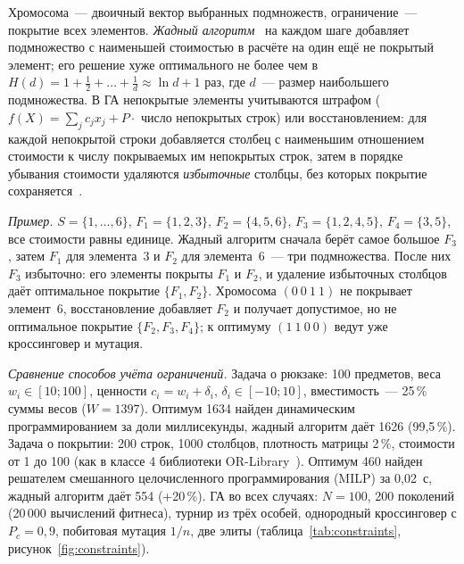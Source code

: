 Хромосома~--- двоичный вектор выбранных подмножеств, ограничение~--- покрытие всех элементов.
\emph{Жадный алгоритм}~\cite{chvatal1979} на каждом шаге добавляет подмножество с наименьшей стоимостью
в расчёте на один ещё не покрытый элемент; его решение хуже оптимального не более чем в
$H(d) = 1 + \frac12 + \ldots + \frac1d \approx \ln d + 1$ раз, где $d$~--- размер наибольшего подмножества.
В ГА непокрытые элементы учитываются штрафом ($f(X) = \sum_j c_j x_j + P \cdot$ число непокрытых
строк) или восстановлением: для каждой непокрытой строки добавляется столбец с наименьшим отношением
стоимости к числу покрываемых им непокрытых строк, затем в порядке убывания стоимости удаляются
\emph{избыточные} столбцы, без которых покрытие сохраняется~\cite{beasley1996}.

\emph{Пример.} $S = \{1, \ldots, 6\}$, $F_1 = \{1, 2, 3\}$, $F_2 = \{4, 5, 6\}$, $F_3 = \{1, 2, 4, 5\}$,
$F_4 = \{3, 5\}$, все стоимости равны единице. Жадный алгоритм сначала берёт самое большое $F_3$, затем
$F_1$ для элемента~3 и $F_2$ для элемента~6~--- три подмножества. После них $F_3$ избыточно: его
элементы покрыты $F_1$ и $F_2$, и удаление избыточных столбцов даёт оптимальное покрытие $\{F_1, F_2\}$.
Хромосома $(0\ 0\ 1\ 1)$ не покрывает элемент~6, восстановление добавляет $F_2$ и получает допустимое,
но не оптимальное покрытие $\{F_2, F_3, F_4\}$; к оптимуму $(1\ 1\ 0\ 0)$ ведут уже кроссинговер и
мутация.

\emph{Сравнение способов учёта ограничений.} Задача о рюкзаке: 100 предметов, веса $w_i \in [10; 100]$,
ценности $c_i = w_i + \delta_i$, $\delta_i \in [-10; 10]$, вместимость~--- 25\,\% суммы весов
($W = 1397$). Оптимум 1634 найден динамическим программированием за доли миллисекунды, жадный алгоритм
даёт 1626 (99,5\,\%). Задача о покрытии: 200 строк, 1000 столбцов, плотность матрицы 2\,\%, стоимости
от 1 до 100 (как в классе 4 библиотеки OR-Library~\cite{beasley1996}). Оптимум 460 найден решателем
смешанного целочисленного программирования (MILP) за 0,02~с, жадный алгоритм даёт 554 (+20\,\%). ГА во
всех случаях: $N = 100$, 200 поколений (20\,000 вычислений фитнеса), турнир из трёх особей, однородный
кроссинговер с $P_c = 0,9$, побитовая мутация $1/n$, две элиты (таблица~\ref{tab:constraints},
рисунок~\ref{fig:constraints}).

